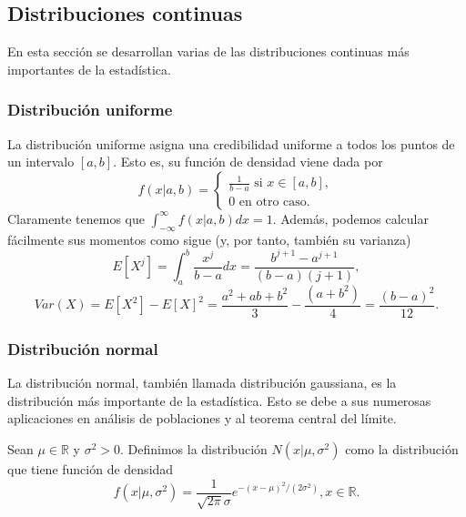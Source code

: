 \subsection{Distribuciones continuas}

En esta sección se desarrollan varias de las distribuciones continuas más importantes de la estadística.

\subsubsection{Distribución uniforme}

La distribución uniforme asigna una credibilidad uniforme a todos los puntos de un intervalo $[a,b]$. Esto es, su función de densidad viene dada por
\[f(x|a,b) = \begin{cases}\frac{1}{b-a} \text{ si } x \in [a,b], \\ 0 \text{ en otro caso.}\end{cases}\]
Claramente tenemos que $\int_{-\infty}^{\infty} f(x |a,b) dx = 1$. Además, podemos calcular fácilmente sus momentos como sigue (y, por tanto, también su varianza)
\[E[X^j] = \int_a^b \frac{x^j}{b-a} dx = \frac{b^{j+1} - a^{j+1}}{(b-a) (j+1)},\]
\[Var(X) = E[X^2] - E[X]^2 = \frac{a^2 + ab + b^2}{3} - \frac{(a+b^2)}{4} = \frac{(b-a)^2}{12}.\]

\subsubsection{Distribución normal}

La distribución normal, también llamada distribución gaussiana, es la distribución más importante de la estadística. Esto se debe a sus numerosas aplicaciones en análisis de poblaciones y al teorema central del límite.

\begin{definition}
    Sean $\mu \in \mathbb{R}$ y $\sigma^2 > 0$. Definimos la distribución $N(x | \mu, \sigma^2)$ como la distribución que tiene función de densidad
    \[f(x | \mu, \sigma^2) = \frac{1}{\sqrt{2\pi}\sigma}e^{-(x-\mu)^2 / (2\sigma^2)}, x \in \mathbb{R}.\]
\end{definition}

